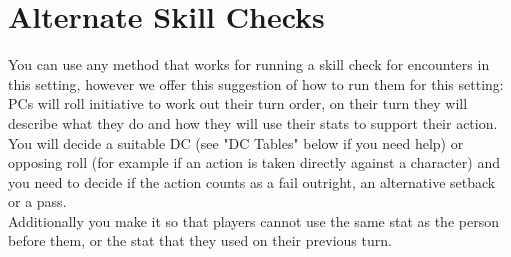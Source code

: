 \documentclass[10pt,twoside,twocolumn]{article}
\begin{document}
\section{Alternate Skill Checks}
You can use any method that works for running a skill check for encounters in this setting, however we offer this suggestion of how to run them for this setting:
PCs will roll initiative to work out their turn order, on their turn they will describe what they do and how they will use their stats to support their action. You will decide a suitable DC (see "DC Tables" below if you need help) or opposing roll (for example if an action is taken directly against a character) and you need to decide if the action counts as a fail outright, an alternative setback or a pass.\\

Additionally you make it so that players cannot use the same stat as the person before them, or the stat that they used on their previous turn.\\
\end{document}
